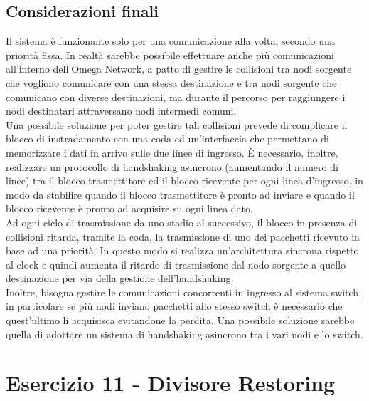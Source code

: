 \documentclass[12pt]{article}
\begin{document}
\subsection{Considerazioni finali}
Il sistema è funzionante solo per una comunicazione alla volta, secondo una priorità fissa. In realtà sarebbe possibile effettuare anche più comunicazioni all’interno dell’Omega Network, a patto di gestire le collisioni tra nodi sorgente che vogliono comunicare con una stessa destinazione e tra nodi sorgente che comunicano con diverse destinazioni, ma durante il percorso per raggiungere i nodi destinatari attraversano nodi intermedi comuni. 
\\Una possibile soluzione per poter gestire tali collisioni prevede di complicare il blocco di instradamento con una coda ed un’interfaccia che permettano di memorizzare i dati in arrivo sulle due linee di ingresso. È necessario, inoltre, realizzare un protocollo di handshaking asincrono (aumentando il numero di linee) tra il blocco trasmettitore ed il blocco ricevente per ogni linea d’ingresso, in modo da stabilire quando il blocco trasmettitore è pronto ad inviare e quando il blocco ricevente è pronto ad acquisire su ogni linea dato. 
\\Ad ogni ciclo di trasmissione da uno stadio al successivo, il blocco in presenza di collisioni ritarda, tramite la coda, la trasmissione di uno dei pacchetti ricevuto in base ad una priorità. In questo modo si realizza un’architettura sincrona rispetto al clock e quindi aumenta il ritardo di trasmissione dal nodo sorgente a quello destinazione per via della gestione dell’handshaking.
\\Inoltre, bisogna gestire le comunicazioni concorrenti in ingresso al sistema switch, in particolare se più nodi inviano pacchetti allo stesso switch è necessario che quest’ultimo li acquisisca evitandone la perdita. Una possibile soluzione sarebbe quella di adottare un sistema di handshaking asincrono tra i vari nodi e lo switch.

\newpage
\section{Esercizio 11 - Divisore Restoring}
\end{document}
